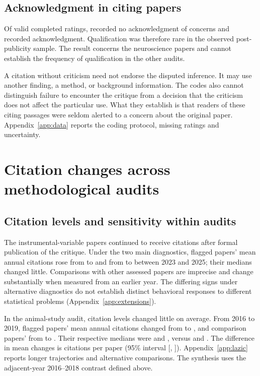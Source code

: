 \documentclass[11pt,letterpaper]{article}
\begin{document}
\subsection{Acknowledgment in citing papers}
Of \Rated{} valid completed ratings, \Nonack{} recorded no acknowledgment of concerns and \Ack{} recorded acknowledgment. Qualification was therefore rare in the observed post-publicity sample. The result concerns the neuroscience papers and cannot establish the frequency of qualification in the other audits.

A citation without criticism need not endorse the disputed inference. It may use another finding, a method, or background information. The codes also cannot distinguish failure to encounter the critique from a decision that the criticism does not affect the particular use. What they establish is that readers of these citing passages were seldom alerted to a concern about the original paper. Appendix~\ref{app:data} reports the coding protocol, missing ratings and uncertainty.

\section{Citation changes across methodological audits}
\subsection{Citation levels and sensitivity within audits}
The instrumental-variable papers continued to receive citations after formal publication of the critique. Under the two main diagnostics, flagged papers' mean annual citations rose from \LalWeakBefore{} to \LalWeakAfter{} and from \LalSensitiveBefore{} to \LalSensitiveAfter{} between 2023 and 2025; their medians changed little. Comparisons with other assessed papers are imprecise and change substantially when measured from an earlier year. The differing signs under alternative diagnostics do not establish distinct behavioral responses to different statistical problems (Appendix~\ref{app:extensions}).

In the animal-study audit, citation levels changed little on average. From 2016 to 2019, flagged papers' mean annual citations changed from \LazicFlaggedBefore{} to \LazicFlaggedAfter{}, and comparison papers' from \LazicComparisonBefore{} to \LazicComparisonAfter{}. Their respective medians were \LazicFlaggedMedianBefore{} and \LazicFlaggedMedianAfter{}, versus \LazicComparisonMedianBefore{} and \LazicComparisonMedianAfter{}. The difference in mean changes is \LazicAbsolute{} citations per paper (95\% interval [\LazicAbsoluteLower, \LazicAbsoluteUpper]). Appendix~\ref{app:lazic} reports longer trajectories and alternative comparisons. The synthesis uses the adjacent-year 2016--2018 contrast defined above.
\end{document}
